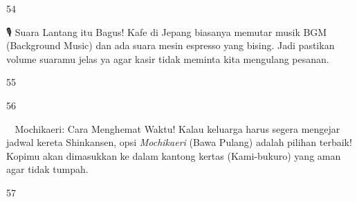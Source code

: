 \begin{convobox}{54}
    \noindent
       

    \vspace{1.5em}
\end{convobox}

\begin{lessonbox}{🎙️ Suara Lantang itu Bagus!}
    Kafe di Jepang biasanya memutar musik BGM (Background Music) dan ada suara mesin espresso yang bising. Jadi pastikan volume suaramu jelas ya agar kasir tidak meminta kita mengulang pesanan.
\end{lessonbox}

\begin{convobox}{55}
    \noindent
     

    \vspace{1.5em}
\end{convobox}

\begin{convobox}{56}
    \noindent

    \vspace{1.5em}
\end{convobox}

\begin{lessonbox}{🚶‍♂️ Mochikaeri: Cara Menghemat Waktu!}
    Kalau keluarga harus segera mengejar jadwal kereta Shinkansen, opsi \textit{Mochikaeri} (Bawa Pulang) adalah pilihan terbaik! Kopimu akan dimasukkan ke dalam kantong kertas (Kami-bukuro) yang aman agar tidak tumpah.
\end{lessonbox}

\begin{convobox}{57}
    \noindent

    \vspace{1.5em}
\end{convobox}

